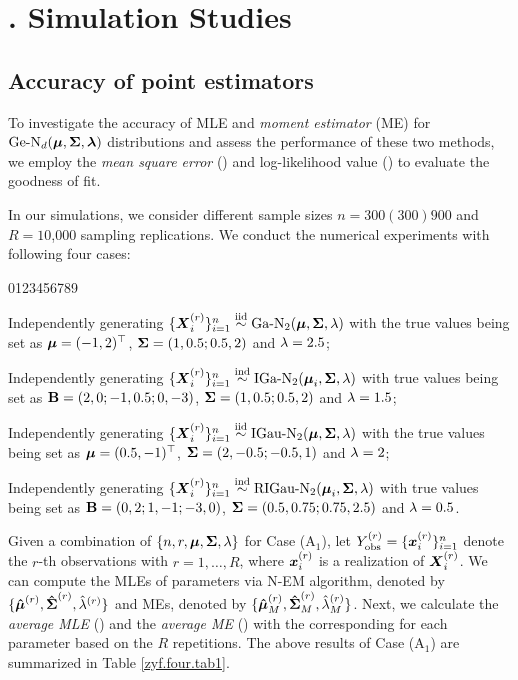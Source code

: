 \section{$\!\!\!\!\!\!\!$. Simulation Studies}    %

\subsection{Accuracy of point estimators}       %

To investigate the accuracy of MLE and \textit{moment estimator} (ME) for $\mbox{Ge-N}_d({\boldsymbol{\mu}}, {\mbox{\boldmath$\Sigma$}}, {\boldsymbol{\lambda}})$ distributions and assess the performance of these two methods, we employ the \textit{mean square error} () and log-likelihood value () to evaluate the goodness of fit.

In our simulations, we consider different sample sizes $n = 300(300)900$ and $R = 10$,000 sampling replications. We conduct the numerical experiments with following four cases:
\begin{namelist}{0123456789}
\item[\hspace*{-0.05cm} Case (A$_1$):] Independently generating $\{{\boldsymbol{X}}_i^{(r)}\}_{i=1}^n \stackrel{{\rm iid}}{\sim} \mbox{Ga-N}_2({\boldsymbol{\mu}}, {\mbox{\boldmath$\Sigma$}}, \lambda)$ with the true values being set as ${\boldsymbol{\mu}} = (-1, 2)^\top$, ${\mbox{\boldmath$\Sigma$}} = (1, 0.5; 0.5, 2)$ and $\lambda = 2.5$;

\item[\hspace*{-0.05cm} Case (A$_2$):] Independently generating $\{{\boldsymbol{X}}_i^{(r)}\}_{i=1}^n \stackrel{{\rm ind}}{\sim} \mbox{IGa-N}_2({\boldsymbol{\mu}}_i, {\mbox{\boldmath$\Sigma$}}, \lambda)$ with true values being set as ${\bf B} = (2, 0; -1, 0.5; 0, -3)$, ${\mbox{\boldmath$\Sigma$}} = (1, 0.5; 0.5, 2)$ and $\lambda = 1.5$;

\item[\hspace*{-0.05cm} Case (A$_3$):] Independently generating $\{{\boldsymbol{X}}_i^{(r)}\}_{i=1}^n \stackrel{{\rm iid}}{\sim} \mbox{IGau-N}_2({\boldsymbol{\mu}}, {\mbox{\boldmath$\Sigma$}}, \lambda)$ with the true values being set as ${\boldsymbol{\mu}} = (0.5, -1)^\top$, ${\mbox{\boldmath$\Sigma$}} = (2, -0.5; -0.5, 1)$ and $\lambda = 2$;

\item[\hspace*{-0.05cm} Case (A$_4$):] Independently generating $\{{\boldsymbol{X}}_i^{(r)}\}_{i=1}^n \stackrel{{\rm ind}}{\sim} \mbox{RIGau-N}_2({\boldsymbol{\mu}}_i, {\mbox{\boldmath$\Sigma$}}, \lambda)$ with true values being set as ${\bf B} = (0, 2; 1, -1; -3, 0)$, ${\mbox{\boldmath$\Sigma$}} = (0.5, 0.75; 0.75, 2.5)$ and $\lambda = 0.5$.
\end{namelist}

Given a combination of $\{n, r, {\boldsymbol{\mu}}, {\mbox{\boldmath$\Sigma$}}, \lambda\}$ for Case (A$_1$), let $Y_{\rm obs}^{(r)} = \{{\boldsymbol{x}}_i^{(r)}\}_{i=1}^n$ denote the $r$-th observations with $r = 1, \dots, R$, where ${\boldsymbol{x}}_i^{(r)}$ is a realization of ${\boldsymbol{X}}_i^{(r)}$. We can compute the MLEs of parameters via N-EM algorithm, denoted by $\{\boldsymbol{\hat{\mu}}^{(r)}, \boldsymbol{\hat{\Sigma}}^{(r)}, \hat{\lambda}^{(r)}\}$ and MEs, denoted by $\{\boldsymbol{\hat{\mu}}_M^{(r)}, \boldsymbol{\hat{\Sigma}}_M^{(r)}, \hat{\lambda}_M^{(r)}\}$. Next, we calculate the \textit{average MLE} () and the \textit{average ME} () with the corresponding  for each parameter based on the $R$ repetitions. The above results of Case (A$_1$) are summarized in Table \ref{zyf.four.tab1}.

